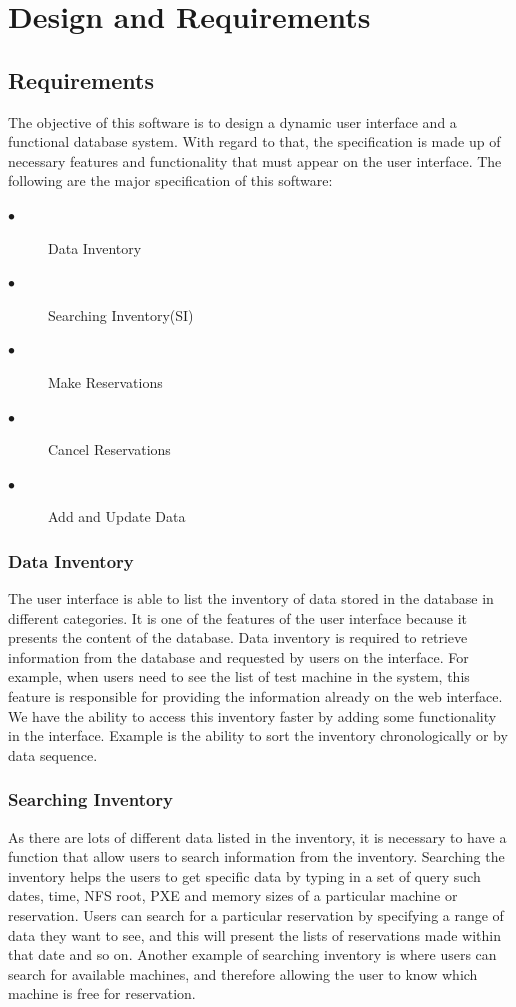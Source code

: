 \chapter{Design and Requirements}
\label{chap:figtab}
\label{chap}
\section{Requirements}
The objective of this software is to  design a dynamic user interface and a functional database system. With regard to that, the specification is made up of necessary features and functionality that must appear on the user interface. The following are the major specification of this software:
\begin{description}
\item[$\bullet$] Data Inventory
\item[$\bullet$] Searching Inventory(SI)
\item[$\bullet$] Make Reservations
\item[$\bullet$] Cancel Reservations
\item[$\bullet$] Add and Update Data
\end{description}
\subsection{Data Inventory}
The user interface is able to list the inventory of data stored in the database in different categories. It is one of the features of the user interface because it presents the content of the database. Data inventory is required to retrieve information from the database and requested by users on the interface. For example, when users need to see the list of test machine in the system, this feature is responsible for providing the information already on the web interface. We have the ability to access this inventory faster by adding some functionality in the interface. Example is the ability to sort the inventory chronologically or by data sequence. 
\subsection{Searching Inventory} \label{searchinventory}
As there are lots of different data listed in the inventory, it is necessary to have a function that allow users to search information from the inventory. Searching the inventory helps the users to get specific data by typing in a set of query such dates, time, NFS root, PXE and memory sizes of a particular machine or reservation. Users can search for a particular reservation by specifying a range of data they want to see, and this will present the lists of reservations made within that date and so on. Another example of searching inventory is where users can search for available machines, and therefore allowing the user to know which machine is free for reservation.
